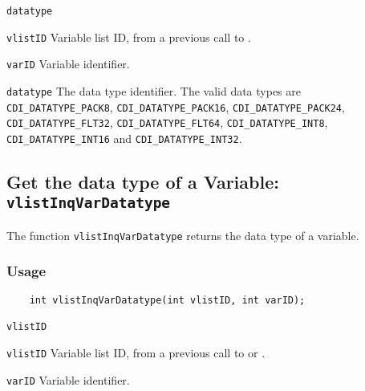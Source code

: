 \hspace*{4mm}\begin{minipage}[]{15cm}
\begin{deflist}{\texttt{datatype}\ }
\item[\texttt{vlistID}]
Variable list ID, from a previous call to {}.
\item[\texttt{varID}]
Variable identifier.
\item[\texttt{datatype}]
The data type identifier.
                    The valid {\CDI} data types are {\texttt{CDI\_DATATYPE\_PACK8}}, {\texttt{CDI\_DATATYPE\_PACK16}},
                    {\texttt{CDI\_DATATYPE\_PACK24}}, {\texttt{CDI\_DATATYPE\_FLT32}}, {\texttt{CDI\_DATATYPE\_FLT64}},
                    {\texttt{CDI\_DATATYPE\_INT8}}, {\texttt{CDI\_DATATYPE\_INT16}} and {\texttt{CDI\_DATATYPE\_INT32}}.

\end{deflist}
\end{minipage}


\subsection{Get the data type of a Variable: \texttt{vlistInqVarDatatype}}
\label{vlistInqVarDatatype}

The function {\texttt{vlistInqVarDatatype}} returns the data type of a variable.

\subsubsection*{Usage}

\begin{verbatim}
    int vlistInqVarDatatype(int vlistID, int varID);
\end{verbatim}

\hspace*{4mm}\begin{minipage}[]{15cm}
\begin{deflist}{\texttt{vlistID}\ }
\item[\texttt{vlistID}]
Variable list ID, from a previous call to {} or {}.
\item[\texttt{varID}]
Variable identifier.

\end{deflist}
\end{minipage}

